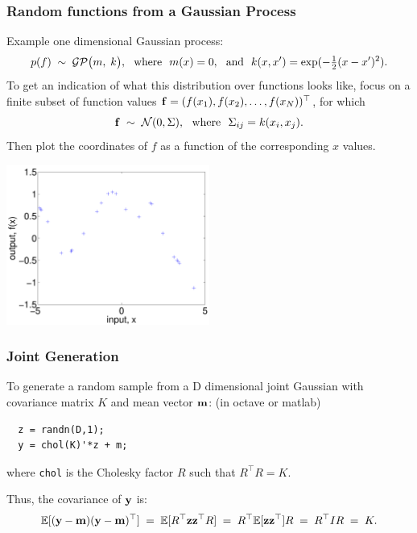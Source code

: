 \begin{frame}
\frametitle{Random functions from a Gaussian Process}

Example one dimensional Gaussian process:
\[
p(f)\;\sim\;{\cal GP}\big(m,\;k\big),
\text{\ \ where\ \ }m(x) = 0,\text{\ \ and\ \ }k(x,x') = \exp(-\tfrac{1}{2}(x-x')^2).
\]
%
To get an indication of what this distribution over functions looks like, focus
on a finite subset of function values
$\mathbf f=(f(x_1),f(x_2),\ldots,f(x_N))^\top$, for which
\[
\mathbf f\;\sim\;{\cal N}(0, \Sigma),\text{\ \ where\ \ }\Sigma_{ij}=k(x_i,x_j).
\]
%
Then plot the coordinates of $f$ as a function of the corresponding $x$ values.
\centerline{\includegraphics[width=0.5\textwidth]{prior1}}
\end{frame}


\begin{frame}[fragile]
\frametitle{Joint Generation}

To generate a random sample from a D dimensional joint Gaussian with
covariance matrix $K$ and mean vector ${\bf m}$: (in octave or matlab)

\begin{verbatim}
  z = randn(D,1);
  y = chol(K)'*z + m;
\end{verbatim}

where \texttt{chol} is the Cholesky factor $R$ such that $R^\top R=K$.

Thus, the covariance of $\mathbf y$ is:
\[
\mathbb{E}[(\mathbf y-{\bf m})(\mathbf y-{\bf m})^\top]\;=\;\mathbb{E}[R^\top{\bf z}
{\bf z}^\top R]\;=\;R^\top\mathbb{E}[{\bf z}{\bf z}^\top]R\;=\;R^\top IR\;=\;K.
\]
\end{frame}


